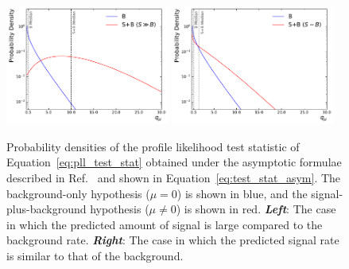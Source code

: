 \begin{figure}[!htb]
    \begin{center}
        \includegraphics[width=0.48\textwidth]{figures/common_ana/stat_hypo/qmu_dist_large_s}
        \includegraphics[width=0.48\textwidth]{figures/common_ana/stat_hypo/qmu_dist_small_s}
        \caption{
            Probability densities of the profile likelihood test statistic of Equation~\ref{eq:pll_test_stat}
            obtained under the asymptotic formulae described in Ref.~\cite{AsymptoticFormula} and shown
            in Equation~\ref{eq:test_stat_asym}.
            The background-only hypothesis ($\mu = 0$) is shown in blue, and the signal-plus-background
            hypothesis ($\mu \ne 0$) is shown in red.
            \textit{\textbf{Left}}: The case in which the predicted amount of signal is large compared to the
                background rate.
            \textit{\textbf{Right}}:  The case in which the predicted signal rate is similar to that of the background.
        }
        \label{fig:qmu_dist}
    \end{center}
\end{figure}
